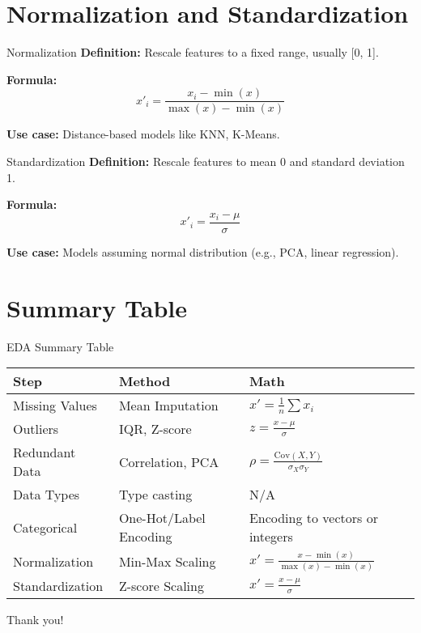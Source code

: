 \documentclass{beamer}
\begin{document}
\section{Normalization and Standardization}
\begin{frame}{Normalization}
\textbf{Definition:} Rescale features to a fixed range, usually [0, 1].

\textbf{Formula:}
\[
x'_i = \frac{x_i - \min(x)}{\max(x) - \min(x)}
\]

\textbf{Use case:} Distance-based models like KNN, K-Means.
\end{frame}

\begin{frame}{Standardization}
\textbf{Definition:} Rescale features to mean 0 and standard deviation 1.

\textbf{Formula:}
\[
x'_i = \frac{x_i - \mu}{\sigma}
\]

\textbf{Use case:} Models assuming normal distribution (e.g., PCA, linear regression).
\end{frame}

\section{Summary Table}
\begin{frame}{EDA Summary Table}
\small
\begin{tabular}{@{}lll@{}}
\toprule
\textbf{Step} & \textbf{Method} & \textbf{Math} \\ \midrule
Missing Values & Mean Imputation & \( x' = \frac{1}{n} \sum x_i \) \\
Outliers & IQR, Z-score & \( z = \frac{x - \mu}{\sigma} \) \\
Redundant Data & Correlation, PCA & \( \rho = \frac{\text{Cov}(X,Y)}{\sigma_X \sigma_Y} \) \\
Data Types & Type casting & N/A \\
Categorical & One-Hot/Label Encoding & Encoding to vectors or integers \\
Normalization & Min-Max Scaling & \( x' = \frac{x - \min(x)}{\max(x) - \min(x)} \) \\
Standardization & Z-score Scaling & \( x' = \frac{x - \mu}{\sigma} \) \\
\bottomrule
\end{tabular}
\end{frame}
\begin{frame}[standout]
    Thank you!
\end{frame}
\end{document}
